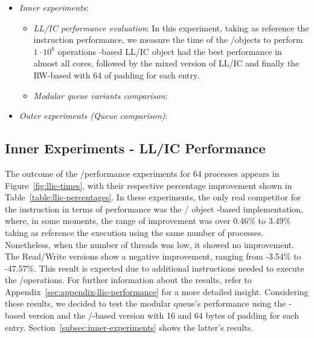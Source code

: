 \begin{itemize}
    \item \textit{Inner experiments}:
    \begin{itemize}
        \item  \textit{LL/IC performance evaluation}: In this experiment, taking as reference the \FAI instruction performance, we measure the time of the \LL/\IC objects to perform \(1\cdot 10^6\) operations \CAS-based LL/IC object had the best performance in almost all cores, followed by the mixed version of LL/IC and finally the RW-based with 64 of padding for each entry.
        \item \textit{Modular queue variants comparison}:
    \end{itemize}
    \item \textit{Outer experiments (Queue comparison)}:
\end{itemize}

\subsection{Inner Experiments - LL/IC Performance}

The outcome of the \LL/\IC performance experiments for 64 processes appears in Figure~\ref{fig:llic-times}, with their respective percentage improvement shown in Table~\ref{table:llic-percentages}. In these experiments, the only real competitor for the \FAI instruction in terms of performance was the \LL/\IC{} object \CAS-based implementation, where, in some moments, the range of improvement was over 0.46\% to 3.49\% taking as reference the execution using the same number of processes. Nonetheless, when the number of threads was low, it showed no improvement. The Read/Write versions show a negative improvement, ranging from -3.54\% to -47.57\%. This result is expected due to additional instructions needed to execute the \LL/\IC operations. For further information about the results, refer to Appendix~\ref{sec:appendix-llic-performance} for a more detailed insight. Considering these results, we decided to test the modular queue's performance using the \CAS-based version and the \R/\W-based version with 16 and 64 bytes of padding for each entry. Section~\ref{subsec:inner-experiments} shows the latter's results.

